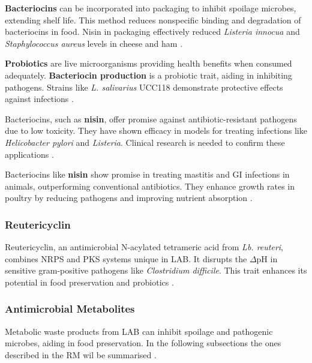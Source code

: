 \textbf{Bacteriocins} can be incorporated into packaging to inhibit spoilage microbes, extending shelf life. This method reduces nonspecific binding and degradation of bacteriocins in food. Nisin in packaging effectively reduced \textit{Listeria innocua} and \textit{Staphylococcus aureus} levels in cheese and ham \cite*{L10-MicroFunct}.

\textbf{Probiotics} are live microorganisms providing health benefits when consumed adequately. \textbf{Bacteriocin production} is a probiotic trait, aiding in inhibiting pathogens. Strains like \textit{L. salivarius} UCC118 demonstrate protective effects against infections \cite*{L10-MicroFunct}.

Bacteriocins, such as \textbf{nisin}, offer promise against antibiotic-resistant pathogens due to low toxicity. They have shown efficacy in models for treating infections like \textit{Helicobacter pylori} and \textit{Listeria}. Clinical research is needed to confirm these applications \cite*{L10-MicroFunct}.

Bacteriocins like \textbf{nisin} show promise in treating mastitis and GI infections in animals, outperforming conventional antibiotics. They enhance growth rates in poultry by reducing pathogens and improving nutrient absorption \cite*{L10-MicroFunct}.

\subsubsection*{Reutericyclin}
Reutericyclin, an antimicrobial N-acylated tetrameric acid from \textit{Lb. reuteri}, combines NRPS and PKS systems unique in LAB. It disrupts the $\Delta$pH in sensitive gram-positive pathogens like \textit{Clostridium difficile}. This trait enhances its potential in food preservation and probiotics \cite*{L10-MicroFunct}.

\subsubsection{Antimicrobial Metabolites}
Metabolic waste products from LAB can inhibit spoilage and pathogenic microbes, aiding in food preservation. In the following subsections the ones described in the RM wil be summarised \cite*{L10-MicroFunct}.

